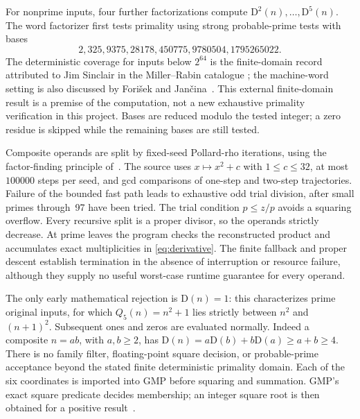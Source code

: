 \documentclass[11pt,a4paper]{article}
\newcommand{\D}{\mathrm{D}}
\theoremstyle{definition}
\theoremstyle{remark}
\begin{document}
For nonprime inputs, four further factorizations compute
$\D^2(n),\ldots,\D^5(n)$. The word factorizer first tests primality using
strong probable-prime tests with bases
\begin{equation}\label{eq:bases}
 2,325,9375,28178,450775,9780504,1795265022.
\end{equation}
The deterministic coverage for inputs below $2^{64}$ is the finite-domain
record attributed to Jim Sinclair in the Miller--Rabin catalogue
\cite{bases}; the machine-word setting is also discussed by Fori\v{s}ek
and Jan\v{c}ina~\cite{forisek}. This external finite-domain result is a
premise of the computation, not a new exhaustive primality verification
in this project. Bases are reduced modulo the tested integer; a zero
residue is skipped while the remaining bases are still tested.

Composite operands are split by fixed-seed Pollard-rho iterations,
using the factor-finding principle of~\cite{pollard}. The source uses
$x\mapsto x^2+c$ with $1\le c\le32$, at most $100000$ steps per seed,
and gcd comparisons of one-step and two-step trajectories. Failure of
the bounded fast path leads to exhaustive odd trial division, after
small primes through~97 have been tried. The trial condition $p\le z/p$
avoids a squaring overflow. Every recursive split is a proper divisor,
so the operands strictly decrease. At prime leaves the program checks
the reconstructed product and accumulates exact multiplicities in
\eqref{eq:derivative}. The finite fallback and proper descent establish
termination in the absence of interruption or resource failure, although
they supply no useful worst-case runtime guarantee for every operand.

The only early mathematical rejection is $\D(n)=1$: this characterizes
prime original inputs, for which $Q_5(n)=n^2+1$ lies strictly between
$n^2$ and $(n+1)^2$. Subsequent ones and zeros are evaluated normally.
Indeed a composite $n=ab$, with $a,b\ge2$, has
$\D(n)=a\D(b)+b\D(a)\ge a+b\ge4$.
There is no family filter, floating-point square decision, or probable-prime
acceptance beyond the stated finite deterministic primality domain.
Each of the six coordinates is imported into GMP before squaring and
summation. GMP's exact square predicate decides membership; an integer
square root is then obtained for a positive result~\cite{gmp}.
\end{document}
